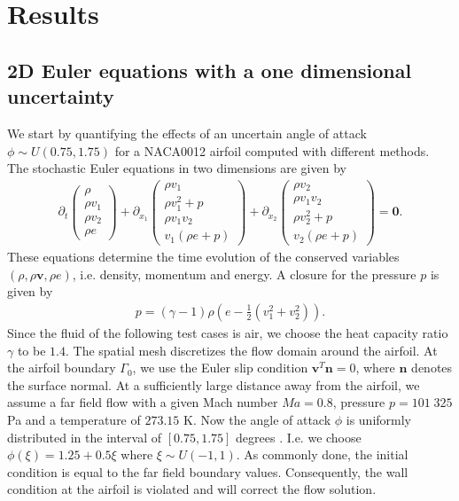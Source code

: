 \section{Results}
\label{sec:results}

\subsection{2D Euler equations with a one dimensional uncertainty}
\label{sec:resultsNACA1D}
We start by quantifying the effects of an uncertain angle of attack $\phi\sim U(0.75,1.75)$ for a NACA0012 airfoil computed with different methods. The stochastic Euler equations in two dimensions are given by
\begin{align*}
\partial_t
\begin{pmatrix}
\rho \\ \rho v_1 \\ \rho v_2 \\ \rho e
\end{pmatrix}
+\partial_{x_1}
\begin{pmatrix}
\rho v_1 \\ \rho v_1^2 +p \\ \rho v_1 v_2 \\  v_1 (\rho e+p)
\end{pmatrix}
+\partial_{x_2}
\begin{pmatrix}
\rho v_2 \\ \rho v_1 v_2 \\ \rho v_2^2+p \\ v_2 (\rho e+p)
\end{pmatrix}
=\bm{0}.
\end{align*}
These equations determine the time evolution of the conserved variables $(\rho,\rho \bm v, \rho e)$, i.e. density, momentum and energy. A closure for the pressure $p$ is given by
\begin{align*}
p = (\gamma-1)\rho\left(e-\frac12(v_1^2+v_2^2)\right).
\end{align*}
Since the fluid of the following test cases is air, we choose the heat capacity ratio $\gamma$ to be $1.4$. The spatial mesh discretizes the flow domain around the airfoil. At the airfoil boundary $\Gamma_{0}$, we use the Euler slip condition $\bm v^T\bm n = 0$, where $\bm n$ denotes the surface normal. At a sufficiently large distance away from the airfoil, we assume a far field flow with a given Mach number $Ma = 0.8$, pressure $p = 101\;325$ Pa and a temperature of $273.15$ K. Now the angle of attack $\phi$ is uniformly distributed in the interval of $[0.75,1.75]$ degrees . I.e. we choose $\phi(\xi) = 1.25 + 0.5\xi$ where $\xi\sim U(-1,1)$. As commonly done, the initial condition is equal to the far field boundary values. Consequently, the wall condition at the airfoil is violated and will correct the flow solution. 

